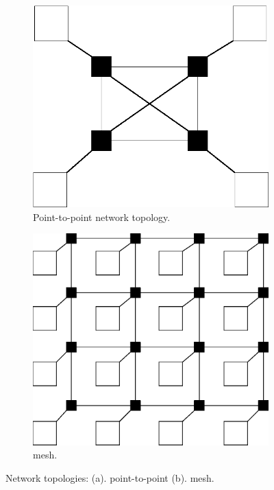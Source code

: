 \begin{figure}
\vspace{10mm}
\centering
\begin{subfigure}{.5\textwidth}
  \centering
  \includegraphics[width=.9\linewidth]{point_to_point.eps}
  \caption{Point-to-point network topology.}
  \label{fig:2.2a}
\end{subfigure}%
\begin{subfigure}{.5\textwidth}
  \centering
  \includegraphics[width=.9\linewidth]{Mesh_topology_2.eps}
  \caption{mesh.}
  \label{fig:2.2b}
\end{subfigure}
\caption[point-to-point and mesh]{Network topologies: (a). point-to-point (b). mesh.}
\label{fig:2.2}
\vspace{10mm}
\end{figure}


